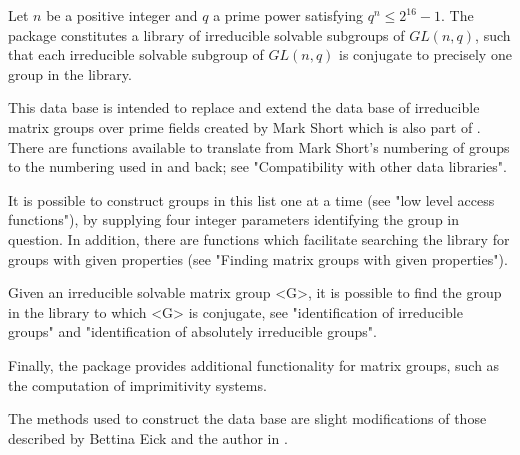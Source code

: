 

Let $n$ be a positive integer and $q$ a prime power satisfying  $q^n \leq
2^{16}-1$. The package {\IRREDSOL} constitutes a library of irreducible
solvable subgroups of $GL(n, q)$, such that each irreducible solvable
subgroup of
$GL(n, q)$ is conjugate to precisely one group in the library. 

This data base is
intended to replace and extend  the data base of irreducible matrix groups
over prime fields created by Mark Short \cite{Sho} which is also part of
{\GAP}. There are functions available to translate from Mark Short's
numbering of groups to the numbering used in {\IRREDSOL} and back; see
"Compatibility with other data libraries".

It is possible to construct groups in this list one at a time (see "low
level access functions"), by supplying four integer parameters identifying
the group in question. In addition, there are functions which facilitate 
searching the library for groups with given properties (see "Finding
matrix groups with given properties").

Given an irreducible solvable matrix group <G>, it is possible
to find the group in the library to which <G> is conjugate, see
"identification of irreducible groups" and "identification of absolutely
irreducible groups".

Finally, the {\IRREDSOL} package provides additional functionality
for matrix groups, such as the computation of imprimitivity systems.

The methods used to construct the data base are slight modifications of
those described by Bettina Eick and the author in \cite{EH}.

